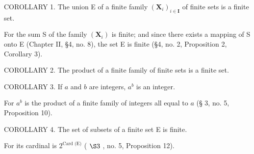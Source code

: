 COROLLARY 1. The union E of a finite family \((\mathbf{X}_i)_{i\in \mathbf{I}}\) of finite sets is a finite set.

For the sum S of the family \((\mathbf{X}_{i})\) is finite; and since there exists a mapping of S onto E (Chapter II, §4, no. 8), the set E is finite (§4, no. 2, Proposition 2, Corollary 3).

COROLLARY 2. The product of a finite family of finite sets is a finite set.

COROLLARY 3. If \(a\) and \(b\) are integers, \(a^b\) is an integer.

For \(a^b\) is the product of a finite family of integers all equal to \(a\) (§ 3, no. 5, Proposition 10).

COROLLARY 4. The set of subsets of a finite set E is finite.

For its cardinal is \(2^{\text{Card (E)}}\) ( \(\S 3\) , no. 5, Proposition 12).

